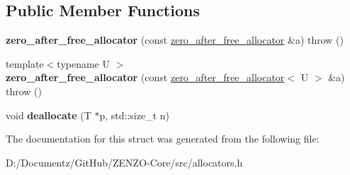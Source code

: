 \subsection*{Public Member Functions}
\begin{DoxyCompactItemize}
\item 
\mbox{\label{structzero__after__free__allocator_a2822b64128f40c3b54ed6dbbf258730b}} 
{\bfseries zero\+\_\+after\+\_\+free\+\_\+allocator} (const \mbox{\hyperlink{structzero__after__free__allocator}{zero\+\_\+after\+\_\+free\+\_\+allocator}} \&a)  throw ()
\item 
\mbox{\label{structzero__after__free__allocator_a9d83915e027c0be7b08d6e5e8e4424ba}} 
{\footnotesize template$<$typename U $>$ }\\{\bfseries zero\+\_\+after\+\_\+free\+\_\+allocator} (const \mbox{\hyperlink{structzero__after__free__allocator}{zero\+\_\+after\+\_\+free\+\_\+allocator}}$<$ U $>$ \&a)  throw ()
\item 
\mbox{\label{structzero__after__free__allocator_a63a1610931a9656c9373bf5dce2db796}} 
void {\bfseries deallocate} (T $\ast$p, std\+::size\+\_\+t n)
\end{DoxyCompactItemize}


The documentation for this struct was generated from the following file\+:\begin{DoxyCompactItemize}
\item 
D\+:/\+Documentz/\+Git\+Hub/\+Z\+E\+N\+Z\+O-\/\+Core/src/allocators.\+h\end{DoxyCompactItemize}
